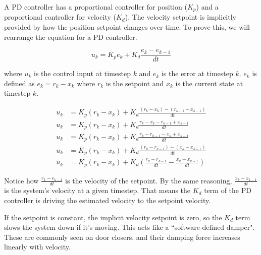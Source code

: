 A PD controller has a proportional controller for position ($K_p$) and a
proportional controller for velocity ($K_d$). The velocity \gls{setpoint} is
implicitly provided by how the position \gls{setpoint} changes over time. To
prove this, we will rearrange the equation for a PD controller.

\begin{equation*}
  u_k = K_p e_k + K_d \frac{e_k - e_{k-1}}{dt}
\end{equation*}

where $u_k$ is the \gls{control input} at timestep $k$ and $e_k$ is the
\gls{error} at timestep $k$. $e_k$ is defined as $e_k = r_k - x_k$ where $r_k$
is the \gls{setpoint} and $x_k$ is the current \gls{state} at timestep $k$.

\begin{align*}
  u_k &= K_p (r_k - x_k) + K_d \frac{(r_k - x_k) - (r_{k-1} - x_{k-1})}{dt} \\
  u_k &= K_p (r_k - x_k) + K_d \frac{r_k - x_k - r_{k-1} + x_{k-1}}{dt} \\
  u_k &= K_p (r_k - x_k) + K_d \frac{r_k - r_{k-1} - x_k + x_{k-1}}{dt} \\
  u_k &= K_p (r_k - x_k) + K_d \frac{(r_k - r_{k-1}) - (x_k - x_{k-1})}{dt} \\
  u_k &= K_p (r_k - x_k) + K_d \left(\frac{r_k - r_{k-1}}{dt} -
    \frac{x_k - x_{k-1}}{dt}\right)
\end{align*}

Notice how $\frac{r_k - r_{k-1}}{dt}$ is the velocity of the \gls{setpoint}. By
the same reasoning, $\frac{x_k - x_{k-1}}{dt}$ is the \gls{system}'s velocity at
a given timestep. That means the $K_d$ term of the PD controller is driving the
estimated velocity to the \gls{setpoint} velocity.

If the \gls{setpoint} is constant, the implicit velocity \gls{setpoint} is zero,
so the $K_d$ term slows the \gls{system} down if it's moving. This acts like a
``software-defined damper". These are commonly seen on door closers, and their
damping force increases linearly with velocity.

